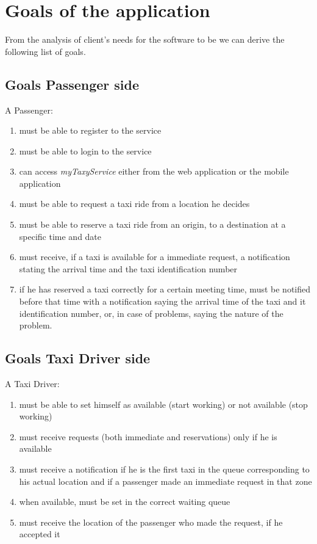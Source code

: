 \section{Goals of the application}
From the analysis of client's needs for the software to be we can derive the following list of goals.
\subsection{Goals Passenger side}
A Passenger:
\begin{enumerate}
\item must be able to register to the service
\item must be able to login to the service
\item can access \textit{myTaxyService} either from the web application or the mobile application
\item must be able to request a taxi ride from a location he decides
\item must be able to reserve a taxi ride from an origin, to a destination at a specific time and date
\item must receive, if a taxi is available for a immediate request, a notification stating the arrival time and the taxi identification number
\item if he has reserved a taxi correctly for a certain meeting time, must be notified before that time with a notification saying the arrival time of the taxi and it identification number, or, in case of problems, saying the nature of the problem.
\end{enumerate}
\subsection{Goals Taxi Driver side}
A Taxi Driver:
\begin{enumerate}
\item must be able to set himself as available (start working) or not available (stop working)
\item must receive requests (both immediate and reservations) only if he is available 
\item must receive a notification if he is the first taxi in the queue corresponding to his actual location and if a passenger made an immediate request in that zone
\item when available, must be set in the correct waiting queue
\item must receive the location of the passenger who made the request, if he accepted it
\end{enumerate}

